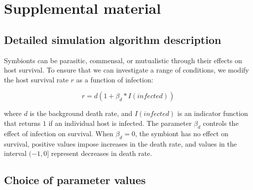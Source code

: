 \documentclass[12pt]{article}
\begin{document}
\newpage

\section*{Supplemental material}

\subsection*{Detailed simulation algorithm description}

Symbionts can be parasitic, commensal, or mutualistic through their effects on host survival.
To ensure that we can investigate a range of conditions, we modify the host survival rate $r$ as a function of infection:

$$r = d(1 + \beta_d * I(infected))$$

where $d$ is the background death rate, and $I(infected)$ is an indicator function that returns $1$ if an individual host is infected. 
The parameter $\beta_d$ controls the effect of infection on survival. 
When $\beta_d = 0$, the symbiont has no effect on survival, positive values impose increases in the death rate, and values in the interval $(-1, 0]$ represent decreases in death rate. 



\subsection*{Choice of parameter values}
\end{document}

